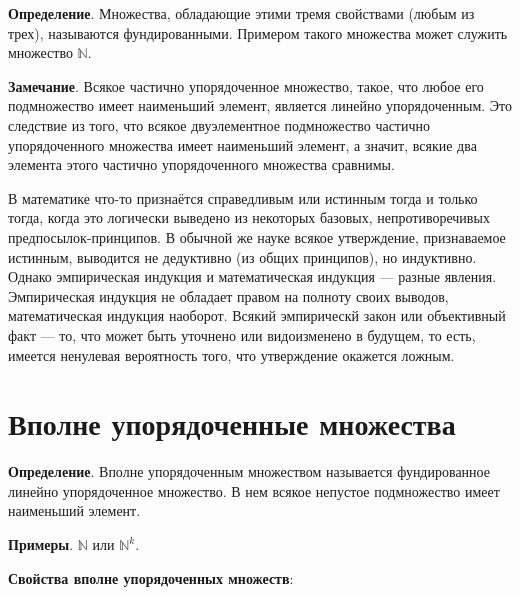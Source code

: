 \documentclass[a4paper]{book}
\begin{document}
\textbf{Определение}. Множества, обладающие этими тремя свойствами (любым из трех), называются фундированными. Примером такого множества может служить множество $\mathbb{N}$. 

\textbf{Замечание}. Всякое частично упорядоченное множество, такое, что любое его подмножество имеет наименьший элемент, является линейно упорядоченным. Это следствие из того, что всякое двуэлементное подмножество частично упорядоченного множества имеет наименьший элемент, а значит, всякие два элемента этого частично упорядоченного множества сравнимы. 

В математике что-то признаётся справедливым или истинным тогда и только тогда, когда это логически выведено из некоторых базовых, непротиворечивых предпосылок-принципов. В обычной же науке всякое утверждение, признаваемое истинным, выводится не дедуктивно (из общих принципов), но индуктивно. Однако эмпирическая индукция и математическая индукция --- разные явления. Эмпирическая индукция не обладает правом на полноту своих выводов, математическая индукция наоборот. Всякий эмпирическй закон или объективный факт --- то, что может быть уточнено или видоизменено в будущем, то есть, имеется ненулевая вероятность того, что утверждение окажется ложным. 


\section{Вполне упорядоченные множества}

\textbf{Определение}. Вполне упорядоченным множеством называется фундированное линейно упорядоченное множество. В нем всякое непустое подмножество имеет наименьший элемент.
 
\textbf{Примеры}. $\mathbb{N}$ или $\mathbb{N}^k$.

\textbf{Свойства вполне упорядоченных множеств}:
\end{document}
